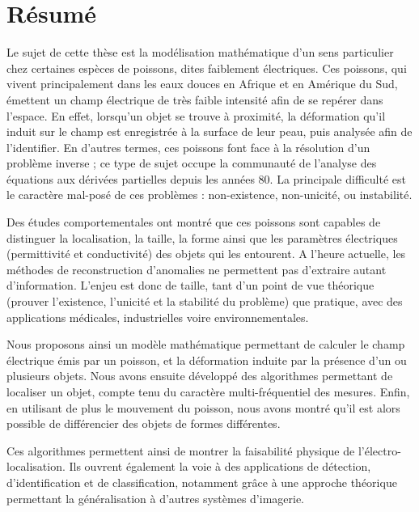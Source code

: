 \chapter*{Résumé}

Le sujet de cette thèse est la modélisation mathématique d'un sens particulier
chez certaines espèces de poissons, dites faiblement électriques.
Ces poissons, qui vivent principalement dans les eaux douces en Afrique et en 
Amérique du Sud, émettent un champ électrique de très faible intensité afin de 
se repérer dans l'espace. En effet, lorsqu'un objet se trouve à proximité, la 
déformation qu'il induit sur le champ est enregistrée à la surface de leur peau,
 puis analysée afin de l'identifier. En d'autres termes, ces poissons font face 
 à la résolution d'un problème inverse ; ce type de sujet occupe la communauté 
 de l'analyse des équations aux dérivées partielles depuis les années 80. La 
 principale difficulté est le caractère mal-posé de ces problèmes : 
 non-existence, non-unicité, ou instabilité. 

Des études comportementales ont montré que ces poissons sont capables de 
distinguer la localisation, la taille, la forme ainsi que les paramètres 
électriques (permittivité et conductivité) des objets qui les entourent. 
A l'heure actuelle, les méthodes de reconstruction d'anomalies ne permettent 
pas d'extraire autant d'information. L'enjeu est donc de taille, tant d'un 
point de vue théorique (prouver l'existence, l'unicité et la stabilité du 
problème) que pratique, avec des applications médicales, industrielles voire 
environnementales.
 
 Nous proposons ainsi un modèle mathématique permettant de calculer le champ
 électrique émis par un poisson, et la déformation induite par la présence d'un 
 ou plusieurs objets. Nous avons ensuite développé des algorithmes permettant de
 localiser un objet, compte tenu du caractère multi-fréquentiel des mesures. Enfin,
 en utilisant de plus le mouvement du poisson, nous avons montré qu'il est alors
 possible de différencier des objets de formes différentes.
 
 Ces algorithmes permettent ainsi de montrer la faisabilité physique de
 l'électro-localisation. Ils ouvrent également la voie à des applications de
 détection, d'identification et de classification, notamment grâce à une approche
 théorique permettant la généralisation à d'autres systèmes d'imagerie.